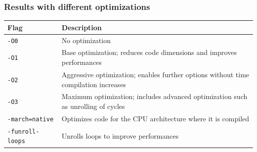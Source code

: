 \documentclass[10pt,externalviewer]{beamer}
\begin{document}
\begin{frame}
   \frametitle{Results with different optimizations}

   \tiny

   \begin{table}[H]
      \centering
      \begin{tabular}{l l}
         \textbf{Flag} & \textbf{Description}\\
         \hline
         \texttt{-O0} & No optimization\\
         \hline
         \texttt{-O1} & Base optimization; reduces code dimensions and improves performances\\
         \hline
         \texttt{-O2} & Aggressive optimization; enables further options without time compilation increases\\
         \hline
         \texttt{-O3} & Maximum optimization; includes advanced optimization such as unrolling of cycles\\
         \hline
         \texttt{-march=native} & Optimizes code for the CPU architecture where it is compiled\\
         \hline
         \texttt{-funroll-loops} & Unrolls loops to improve performances
      \end{tabular}
   \end{table}


\end{frame}
\end{document}
